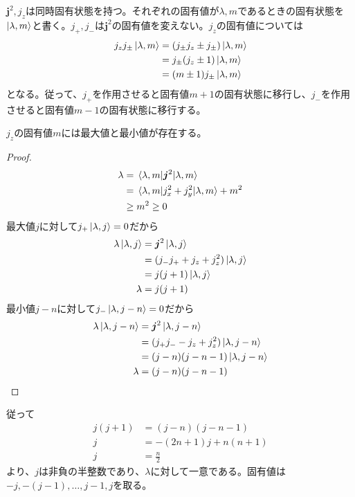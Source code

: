     $\bm{j}^2, j_z$は同時固有状態を持つ。それぞれの固有値が$\lambda, m$であるときの固有状態を$\ket{\lambda, m}$と書く。$j_+, j_-$は$\bm{j}^2$の固有値を変えない。$j_z$の固有値については
    \begin{align*}
        j_zj_{\pm}\ket{\lambda, m}
            &= (j_{\pm}j_z \pm j_{\pm})\ket{\lambda, m}\\
            &= j_{\pm}(j_z \pm 1)\ket{\lambda, m}\\
            &= (m \pm 1)j_{\pm}\ket{\lambda, m}
    \end{align*}
    となる。従って、$j_+$を作用させると固有値$m + 1$の固有状態に移行し、$j_-$を作用させると固有値$m - 1$の固有状態に移行する。
    \begin{thm}
        $j_z$の固有値$m$には最大値と最小値が存在する。
    \end{thm}
    \begin{proof}
        \begin{align*}
            \lambda &= \ev{\bm{j}^2}{\lambda, m}\\
                    &= \ev{j_x^2 + j_y^2}{\lambda, m} + m^2\\
                    &\geq m^2 \geq 0
        \end{align*}
        最大値$j$に対して$j_+\ket{\lambda, j} = 0$だから
        \begin{align*}
            \lambda\ket{\lambda, j}
                &= \bm{j}^2\ket{\lambda, j}\\
                &= (j_-j_+ + j_z + j_z^2)\ket{\lambda, j}\\
                &= j(j + 1)\ket{\lambda, j}\\
            \lambda &= j(j + 1)
        \end{align*}
        最小値$j - n$に対して$j_-\ket{\lambda, j - n} = 0$だから
        \begin{align*}
            \lambda\ket{\lambda, j - n}
                &= \bm{j}^2\ket{\lambda, j - n}\\
                &= (j_+j_- - j_z + j_z^2)\ket{\lambda, j - n}\\
                &= (j - n)(j - n - 1)\ket{\lambda, j - n}\\
            \lambda &= (j - n)(j - n - 1)
        \end{align*}
    \end{proof}
    従って
    \begin{align*}
        j(j + 1) &= (j - n)(j - n - 1)\\
        j &= -(2n + 1)j + n(n + 1)\\
        j &= \frac{n}{2}
    \end{align*}
    より、$j$は非負の半整数であり、$\lambda$に対して一意である。固有値は$-j, -(j - 1), \dots, j - 1, j$を取る。

